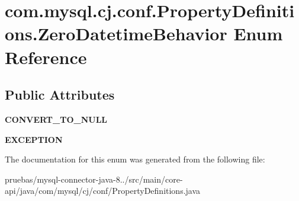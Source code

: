 \hypertarget{enumcom_1_1mysql_1_1cj_1_1conf_1_1_property_definitions_1_1_zero_datetime_behavior}{}\section{com.\+mysql.\+cj.\+conf.\+Property\+Definitions.\+Zero\+Datetime\+Behavior Enum Reference}
\label{enumcom_1_1mysql_1_1cj_1_1conf_1_1_property_definitions_1_1_zero_datetime_behavior}
\subsection*{Public Attributes}
\begin{DoxyCompactItemize}
\item 
\mbox{\label{enumcom_1_1mysql_1_1cj_1_1conf_1_1_property_definitions_1_1_zero_datetime_behavior_af7b02eb0955c75c9559565817299fc4e}} 
{\bfseries C\+O\+N\+V\+E\+R\+T\+\_\+\+T\+O\+\_\+\+N\+U\+LL}
\item 
\mbox{\label{enumcom_1_1mysql_1_1cj_1_1conf_1_1_property_definitions_1_1_zero_datetime_behavior_a1ccf4f0a58ccb45121c8f1a1c78277eb}} 
{\bfseries E\+X\+C\+E\+P\+T\+I\+ON}
\end{DoxyCompactItemize}


The documentation for this enum was generated from the following file\+:\begin{DoxyCompactItemize}
\item 
pruebas/mysql-\/connector-\/java-\/8../src/main/core-\/api/java/com/mysql/cj/conf/Property\+Definitions.\+java\end{DoxyCompactItemize}
